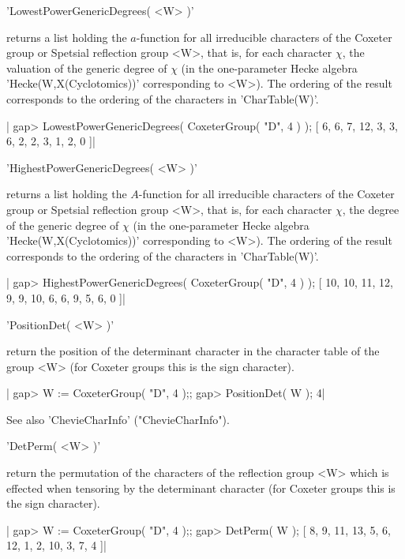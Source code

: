 'LowestPowerGenericDegrees( <W> )'

returns  a list holding the $a$-function  for all irreducible characters of
the  Coxeter  group  or  Spetsial  reflection  group <W>, that is, for each
character  $\chi$, the  valuation of  the generic  degree of $\chi$ (in the
one-parameter  Hecke  algebra  'Hecke(W,X(Cyclotomics))'  corresponding  to
<W>).  The  ordering  of  the  result  corresponds  to  the ordering of the
characters in 'CharTable(W)'.

|    gap> LowestPowerGenericDegrees( CoxeterGroup( "D", 4 ) );
    [ 6, 6, 7, 12, 3, 3, 6, 2, 2, 3, 1, 2, 0 ]|


'HighestPowerGenericDegrees( <W> )'

returns  a list holding the $A$-function  for all irreducible characters of
the  Coxeter  group  or  Spetsial  reflection  group <W>, that is, for each
character  $\chi$,  the  degree  of  the  generic  degree of $\chi$ (in the
one-parameter  Hecke  algebra  'Hecke(W,X(Cyclotomics))'  corresponding  to
<W>).  The  ordering  of  the  result  corresponds  to  the ordering of the
characters in 'CharTable(W)'.

|    gap> HighestPowerGenericDegrees( CoxeterGroup( "D", 4 ) );
    [ 10, 10, 11, 12, 9, 9, 10, 6, 6, 9, 5, 6, 0 ]|


'PositionDet( <W> )'

return  the position of the determinant character in the character table of
the group <W> (for Coxeter groups this is the sign character).

|    gap> W := CoxeterGroup( "D", 4 );;
    gap> PositionDet( W );
    4|

See also 'ChevieCharInfo' ("ChevieCharInfo").


'DetPerm( <W> )'

return  the permutation of the characters of the reflection group <W> which
is effected when tensoring by the determinant character (for Coxeter groups
this is the sign character).

|    gap> W := CoxeterGroup( "D", 4 );;
    gap> DetPerm( W );
    [ 8, 9, 11, 13, 5, 6, 12, 1, 2, 10, 3, 7, 4 ]|

